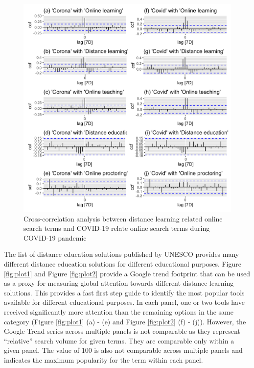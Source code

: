 \documentclass[11pt,a4paper,]{article}
\begin{document}
\begin{figure}[h]

{\centering \includegraphics[width=1\textwidth]{figure/ccfAnalysis-1} 

}

\caption{Cross-correlation analysis between distance learning related online search terms and COVID-19 relate online search terms during COVID-19 pandemic}\label{fig:ccfAnalysis}
\end{figure}

The list of distance education solutions published by UNESCO provides many different distance education solutions for different educational purposes. Figure \ref{fig:plot1} and Figure \ref{fig:plot2} provide a Google trend footprint that can be used as a proxy for measuring global attention towards different distance learning solutions. This provides a fast first step guide to identify the most popular tools available for different educational purposes. In each panel, one or two tools have received significantly more attention than the remaining options in the same category (Figure \ref{fig:plot1} (a) - (e) and Figure \ref{fig:plot2} (f) - (j)). However, the Google Trend series across multiple panels is not comparable as they represent ``relative'' search volume for given terms. They are comparable only within a given panel. The value of 100 is also not comparable across multiple panels and indicates the maximum popularity for the term within each panel.
\end{document}
